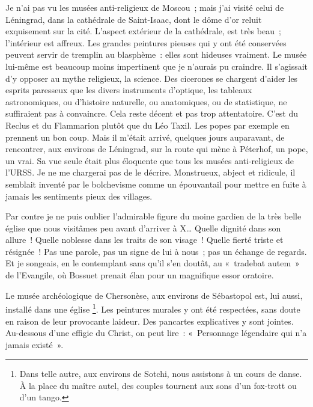\documentclass[french,twoside]{book} %
\newcommand{\astermono}{\medskip\centerline{\color{rubric}\large\selectfont{\syms ✻}}\medskip\par}%
\begin{document}
\noindent Je n’ai pas vu les musées anti-religieux de Moscou ; mais j’ai visité celui de Léningrad, dans la cathédrale de Saint-Isaac, dont le dôme d’or reluit exquisement sur la cité. L’aspect extérieur de la cathédrale, est très beau ; l’intérieur est affreux. Les grandes peintures pieuses qui y ont été conservées peuvent servir de tremplin au blasphème : elles sont hideuses vraiment. Le musée lui-même est beaucoup moins impertinent que je n’aurais pu craindre. Il s’agissait d’y opposer au mythe religieux, la science. Des cicerones se chargent d’aider les esprits paresseux que les divers instruments d’optique, les tableaux astronomiques, ou d’histoire naturelle, ou anatomiques, ou de statistique, ne suffiraient pas à convaincre. Cela reste décent et pas trop attentatoire. C’est du Reclus et du Flammarion plutôt que du Léo Taxil. Les popes par exemple en prennent un bon coup. Mais il m’était arrivé, quelques jours auparavant, de rencontrer, aux environs de Léningrad, sur la route qui mène à Péterhof, un pope, un vrai. Sa vue seule était plus éloquente que tous les musées anti-religieux de l’URSS. Je ne me chargerai pas de le décrire. Monstrueux, abject et ridicule, il semblait inventé par le bolchevisme comme un épouvantail pour mettre en fuite à jamais les sentiments pieux des villages.\par
Par contre je ne puis oublier l’admirable figure du moine gardien de la très belle église que nous visitâmes peu avant d’arriver à X… Quelle dignité dans son allure ! Quelle noblesse dans les traits de son visage ! Quelle fierté triste et résignée ! Pas une parole, pas un signe de lui à nous ; pas un échange de regards. Et je songeais, en le contemplant sans qu’il s’en doutât, au « tradebat autem » de l’Evangile, où Bossuet prenait élan pour un magnifique essor oratoire.\par
Le musée archéologique de Chersonèse, aux environs de Sébastopol est, lui aussi, installé dans une église \footnote{Dans telle autre, aux environs de Sotchi, nous assistons à un cours de danse. À la place du maître autel, des couples tournent aux sons d’un fox-trott ou d’un tango.}. Les peintures murales y ont été respectées, sans doute en raison de leur provocante laideur. Des pancartes explicatives y sont jointes. Au-dessous d’une effigie du Christ, on peut lire : « Personnage légendaire qui n’a jamais existé ».\par

\astermono
\end{document}
